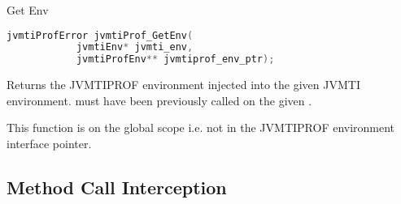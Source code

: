 \begin{apidef}{Get Env}
\begin{lstlisting}[language=C]
jvmtiProfError jvmtiProf_GetEnv(
            jvmtiEnv* jvmti_env,
            jvmtiProfEnv** jvmtiprof_env_ptr);
\end{lstlisting}

\begin{apidesc}
Returns the JVMTIPROF environment injected into the given JVMTI environment.  must have been previously called on the given .

This function is on the global scope i.e. not in the JVMTIPROF environment interface pointer.
\end{apidesc}

\begin{apiphase}
\apiphaseany
\end{apiphase}

\begin{apicap}
\apicaprequired
\end{apicap}

\begin{apiparam}
\end{apiparam}

\apireturnempty

\begin{apierror}
\end{apierror}
\end{apidef}

\subsection{Method Call Interception}

